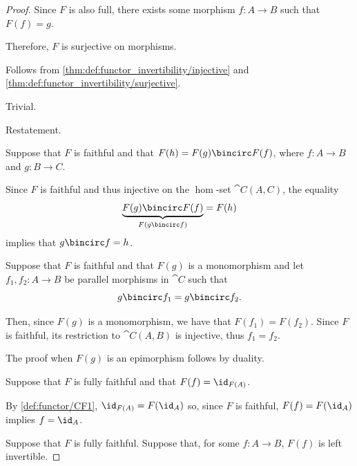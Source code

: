\begin{proof}
  Since \( F \) is also full, there exists some morphism \( f: A \to B \) such that \( F(f) = g \).

  Therefore, \( F \) is surjective on morphisms.

   Follows from \cref{thm:def:functor_invertibility/injective} and \cref{thm:def:functor_invertibility/surjective}.

   Trivial.

   Restatement.

   Suppose that \( F \) is faithful and that \( F(h) = F(g) \bincirc F(f) \), where \( f: A \to B \) and \( g: B \to C \).

  Since \( F \) is faithful and thus injective on the \( \hom \)-set \( \cat{C}(A, C) \), the equality
  \begin{equation*}
    \underbrace{F(g) \bincirc F(f)}_{F(g \bincirc f)} = F(h)
  \end{equation*}
  implies that \( g \bincirc f = h \).

   Suppose that \( F \) is faithful and that \( F(g) \) is a monomorphism and let \( f_1, f_2: A \to B \) be parallel morphisms in \( \cat{C} \) such that
  \begin{equation*}
    g \bincirc f_1 = g \bincirc f_2.
  \end{equation*}

  Then, since \( F(g) \) is a monomorphism, we have that \( F(f_1) = F(f_2) \). Since \( F \) is faithful, its restriction to \( \cat{C}(A, B) \) is injective, thus \( f_1 = f_2 \).

  The proof when \( F(g) \) is an epimorphism follows by duality.

   Suppose that \( F \) is fully faithful and that \( F(f) = \id_{F(A)} \).

  By \ref{def:functor/CF1}, \( \id_{F(A)} = F(\id_A) \) so, since \( F \) is faithful, \( F(f) = F(\id_A) \) implies \( f = \id_A \).

   Suppose that \( F \) is fully faithful. Suppose that, for some \( f: A \to B \), \( F(f) \) is left invertible.


\end{proof}

